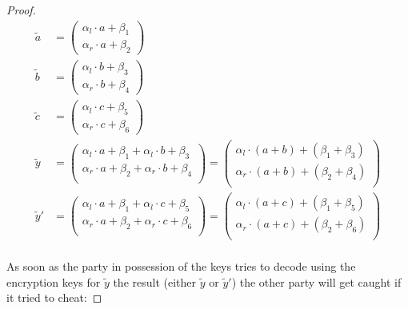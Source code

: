 \begin{proof}
  \begin{align*}
    \widetilde{a} &=
    \begin{pmatrix}
      \alpha_l \cdot a + \beta_1\\
      \alpha_r \cdot a + \beta_2
    \end{pmatrix}\\
    \widetilde{b} &=
    \begin{pmatrix}
      \alpha_l \cdot b + \beta_3\\
      \alpha_r \cdot b + \beta_4
    \end{pmatrix}\\
    \widetilde{c} &=
    \begin{pmatrix}
      \alpha_l \cdot c + \beta_5\\
      \alpha_r \cdot c + \beta_6
    \end{pmatrix}\\
    \widetilde{y} &=
    \begin{pmatrix}
      \alpha_l \cdot a + \beta_1 + \alpha_l \cdot b + \beta_3\\
      \alpha_r \cdot a + \beta_2 + \alpha_r \cdot b + \beta_4\\
    \end{pmatrix} =
    \begin{pmatrix}
      \alpha_l \cdot (a+b) + (\beta_1 + \beta_3)\\
      \alpha_r \cdot (a+b) + (\beta_2 + \beta_4)\\
    \end{pmatrix}\\
    \widetilde{y}' &=
    \begin{pmatrix}
      \alpha_l \cdot a + \beta_1 + \alpha_l \cdot c + \beta_5\\
      \alpha_r \cdot a + \beta_2 + \alpha_r \cdot c + \beta_6\\
    \end{pmatrix} =
    \begin{pmatrix}
      \alpha_l \cdot (a+c) + (\beta_1 + \beta_5)\\
      \alpha_r \cdot (a+c) + (\beta_2 + \beta_6)\\
    \end{pmatrix}\\
  \end{align*}

  As soon as the party in possession of the keys tries to decode using the
  encryption keys for $\widetilde{y}$ the result (either $\widetilde{y}$ or
  $\widetilde{y}'$) the other party will get caught if it tried to cheat:


\end{proof}
